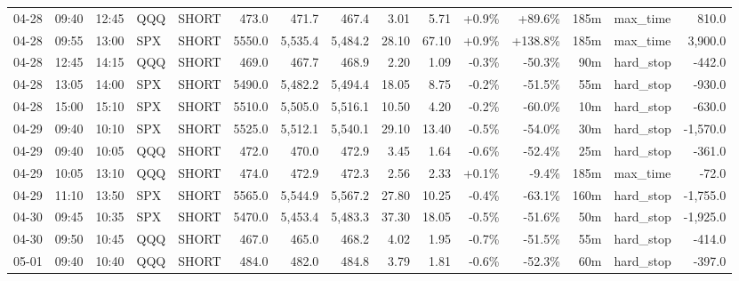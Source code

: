 \documentclass[11pt,a4paper,twoside]{article}
\begin{document}
\begin{landscape}
\begin{center}
\begin{longtable}{>{\color{txtmain}}l l l l l r r r r r r r r >{\color{txtmain}}l r}
04-28 & 09:40 & 12:45 & QQQ & SHORT & 473.0 & 471.7 & 467.4 & 3.01 & 5.71 & \textcolor{wingreen}{+0.9\%} & \textcolor{wingreen}{+89.6\%} & 185m & max\_time & \textcolor{wingreen}{810.0} \\
04-28 & 09:55 & 13:00 & SPX & SHORT & 5550.0 & 5,535.4 & 5,484.2 & 28.10 & 67.10 & \textcolor{wingreen}{+0.9\%} & \textcolor{wingreen}{+138.8\%} & 185m & max\_time & \textcolor{wingreen}{3,900.0} \\
04-28 & 12:45 & 14:15 & QQQ & SHORT & 469.0 & 467.7 & 468.9 & 2.20 & 1.09 & \textcolor{lossred}{-0.3\%} & \textcolor{lossred}{-50.3\%} & 90m & hard\_stop & \textcolor{lossred}{-442.0} \\
04-28 & 13:05 & 14:00 & SPX & SHORT & 5490.0 & 5,482.2 & 5,494.4 & 18.05 & 8.75 & \textcolor{lossred}{-0.2\%} & \textcolor{lossred}{-51.5\%} & 55m & hard\_stop & \textcolor{lossred}{-930.0} \\
04-28 & 15:00 & 15:10 & SPX & SHORT & 5510.0 & 5,505.0 & 5,516.1 & 10.50 & 4.20 & \textcolor{lossred}{-0.2\%} & \textcolor{lossred}{-60.0\%} & 10m & hard\_stop & \textcolor{lossred}{-630.0} \\
04-29 & 09:40 & 10:10 & SPX & SHORT & 5525.0 & 5,512.1 & 5,540.1 & 29.10 & 13.40 & \textcolor{lossred}{-0.5\%} & \textcolor{lossred}{-54.0\%} & 30m & hard\_stop & \textcolor{lossred}{-1,570.0} \\
04-29 & 09:40 & 10:05 & QQQ & SHORT & 472.0 & 470.0 & 472.9 & 3.45 & 1.64 & \textcolor{lossred}{-0.6\%} & \textcolor{lossred}{-52.4\%} & 25m & hard\_stop & \textcolor{lossred}{-361.0} \\
04-29 & 10:05 & 13:10 & QQQ & SHORT & 474.0 & 472.9 & 472.3 & 2.56 & 2.33 & \textcolor{wingreen}{+0.1\%} & \textcolor{lossred}{-9.4\%} & 185m & max\_time & \textcolor{lossred}{-72.0} \\
04-29 & 11:10 & 13:50 & SPX & SHORT & 5565.0 & 5,544.9 & 5,567.2 & 27.80 & 10.25 & \textcolor{lossred}{-0.4\%} & \textcolor{lossred}{-63.1\%} & 160m & hard\_stop & \textcolor{lossred}{-1,755.0} \\
04-30 & 09:45 & 10:35 & SPX & SHORT & 5470.0 & 5,453.4 & 5,483.3 & 37.30 & 18.05 & \textcolor{lossred}{-0.5\%} & \textcolor{lossred}{-51.6\%} & 50m & hard\_stop & \textcolor{lossred}{-1,925.0} \\
04-30 & 09:50 & 10:45 & QQQ & SHORT & 467.0 & 465.0 & 468.2 & 4.02 & 1.95 & \textcolor{lossred}{-0.7\%} & \textcolor{lossred}{-51.5\%} & 55m & hard\_stop & \textcolor{lossred}{-414.0} \\
05-01 & 09:40 & 10:40 & QQQ & SHORT & 484.0 & 482.0 & 484.8 & 3.79 & 1.81 & \textcolor{lossred}{-0.6\%} & \textcolor{lossred}{-52.3\%} & 60m & hard\_stop & \textcolor{lossred}{-397.0} \\

\end{longtable}
\end{center}
\end{landscape}
\end{document}
